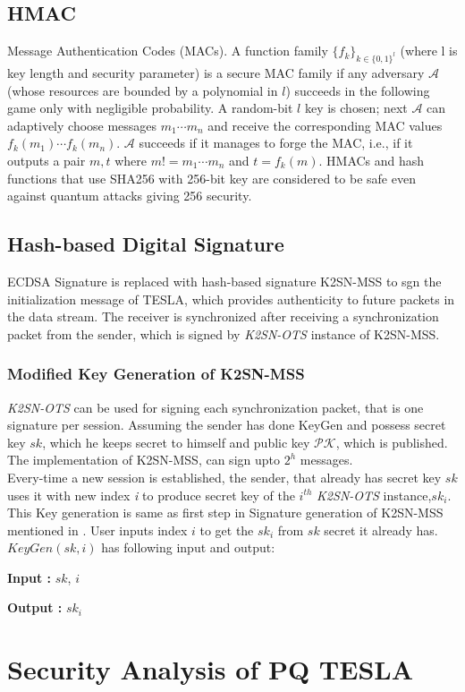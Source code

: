 \subsection{HMAC}
Message Authentication Codes (MACs). A function family $\{f_{k}\}_{k \in \{0,1\}^{l}}$ (where l is key length and security parameter) is a secure MAC family if any adversary $\mathcal{A}$ (whose resources are bounded by a polynomial in $l$) succeeds in the following game only with negligible probability. A random-bit $l$ key is chosen; next
$\mathcal{A}$ can adaptively choose messages $m_{1} \cdots m_{n}$ and receive the corresponding MAC values $f_{k}(m_{1}) \cdots f_{k}(m_{n})$. $\mathcal{A}$ succeeds if
it manages to forge the MAC, i.e., if it outputs a pair $m,t$ where $m!=m_{1}\cdots m_{n}$ and $t=f_{k}(m)$. HMACs and hash functions that use SHA256 with 256-bit key are considered to be safe even against quantum attacks giving 256 security.



\subsection{Hash-based Digital Signature}
ECDSA Signature is replaced with hash-based signature K2SN-MSS to sgn the initialization message of TESLA, which provides authenticity to future packets in the data stream. The receiver is synchronized after receiving a synchronization packet from the sender, which is signed by \textit{K2SN-OTS} instance of K2SN-MSS.

\subsubsection{Modified Key Generation of K2SN-MSS}
 \textit{K2SN-OTS} can be used for signing each synchronization packet, that is one signature per session. Assuming the sender has done KeyGen and possess secret key $sk$, which he keeps secret to himself and public key $\mathcal{PK}$, which is published. The implementation of K2SN-MSS, can sign upto $2^{h}$ messages. \\
Every-time a new session is established, the sender, that already has secret key $sk$ uses it with new index \textit{i} to produce secret key of the $i^{th}$ \textit{K2SN-OTS} instance,$sk_{i}$. This Key generation is same as first step in Signature generation of K2SN-MSS mentioned in \cite{karati2019k2sn}. 
User inputs index $i$ to get the $sk_{i}$ from $sk$ secret it already has.\\
$KeyGen(sk,i)$ has following input and output: 

\textbf{Input : } $sk$, $i$

\textbf{Output : } $sk_{i}$


\section{Security Analysis of PQ TESLA}








